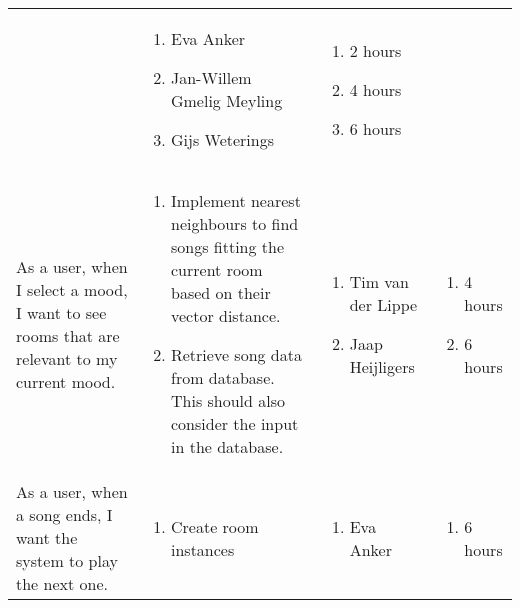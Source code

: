 \documentclass[11pt,a4paper]{article}
\begin{document}
\begin{table}[h]
\begin{tabular}{|p{4.5cm}|p{7cm}|p{4cm}|p{2.6cm}|}
& 
\begin{enumerate}
\item Eva Anker
\item Jan-Willem Gmelig Meyling
\item Gijs Weterings
\end{enumerate}

& 
\begin{enumerate}
\item 2 hours
\item 4 hours
\item 6 hours
\end{enumerate}
\\

As a user, when I select a mood, I want to see rooms that are relevant to my current mood.

&
\begin{enumerate}
\item Implement nearest neighbours to find songs fitting the current room based on their vector distance.
\item Retrieve song data from database. This should also consider the input in the database.
\end{enumerate}

& 
\begin{enumerate}
\item Tim van der Lippe
\item Jaap Heijligers
\end{enumerate}

& 
\begin{enumerate}
\item 4 hours
\item 6 hours
\end{enumerate}
\\

As a user, when a song ends, I want the system to play the next one.
&
\begin{enumerate}
\item Create room instances 
\end{enumerate}

& 
\begin{enumerate}
\item Eva Anker
\end{enumerate}

& 
\begin{enumerate}
\item 6 hours
\end{enumerate}
\\



\end{tabular}
\end{table}
\end{document}

